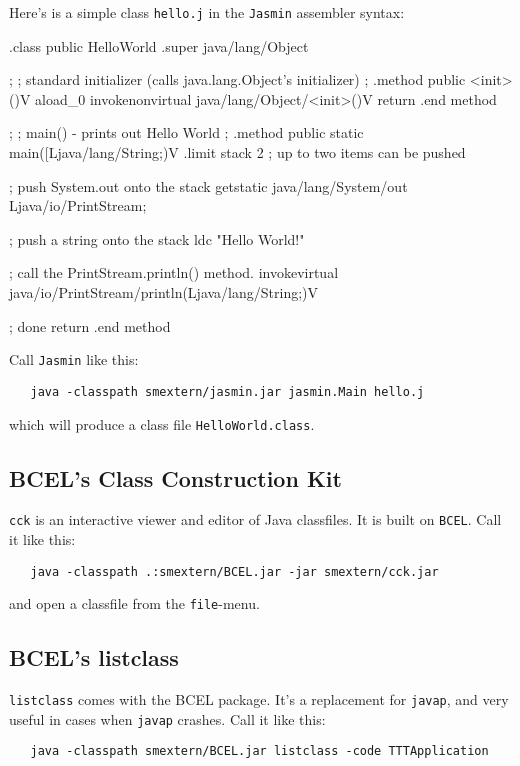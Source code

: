 Here's is a simple class {\tt hello.j} in the {\tt Jasmin}
assembler syntax:
\begin{listing}{1}
    .class public HelloWorld
    .super java/lang/Object

    ;
    ; standard initializer (calls java.lang.Object's initializer)
    ;
    .method public <init>()V
       aload_0
       invokenonvirtual java/lang/Object/<init>()V
       return
    .end method

    ;
    ; main() - prints out Hello World
    ;
    .method public static main([Ljava/lang/String;)V
       .limit stack 2   ; up to two items can be pushed

       ; push System.out onto the stack
       getstatic java/lang/System/out Ljava/io/PrintStream;

       ; push a string onto the stack
       ldc "Hello World!"

       ; call the PrintStream.println() method.
       invokevirtual java/io/PrintStream/println(Ljava/lang/String;)V

       ; done
       return
    .end method
\end{listing}

Call {\tt Jasmin} like this:
\begin{verbatim}
   java -classpath smextern/jasmin.jar jasmin.Main hello.j
\end{verbatim}
which will produce a class file {\tt HelloWorld.class}.


\subsection{BCEL's Class Construction Kit}
{\tt cck} is an interactive viewer and editor of Java classfiles.
It is built on {\tt BCEL}. Call it like this:
\begin{verbatim}
   java -classpath .:smextern/BCEL.jar -jar smextern/cck.jar
\end{verbatim}
and open a classfile from the {\tt file}-menu.


\subsection{BCEL's listclass}
{\tt listclass} comes with the BCEL package. It's
a replacement for {\tt javap}, and very useful
in cases when {\tt javap} crashes. Call it like
this:
\begin{verbatim}
   java -classpath smextern/BCEL.jar listclass -code TTTApplication
\end{verbatim}

